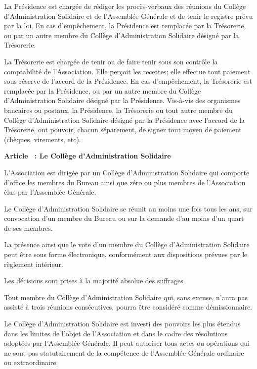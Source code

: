 \documentclass [11pt]{article}
\renewcommand {\section}[1]{\stepcounter {section}%
{\vspace {1em}\noindent\Large \bf Article \thesection\ : #1 \par}}
\begin{document}
La Présidence est chargée de rédiger les procès-verbaux des réunions du
Collège d'Administration Solidaire et de l'Assemblée Générale et de tenir le
registre prévu par la loi. En cas d'empêchement, la Présidence est remplacée
par la Trésorerie, ou par un autre membre du Collège d'Administration Solidaire
désigné par la Trésorerie.

La Trésorerie est chargée de tenir ou de faire tenir sous son contrôle la
comptabilité de l'Association. Elle perçoit les recettes; elle effectue tout
paiement sous réserve de l'accord de la Présidence. En cas d'empêchement, la
Trésorerie est remplacée par la Présidence, ou par un autre membre du Collège
d'Administration Solidaire désigné par la Présidence. Vis-à-vis des organismes
bancaires ou postaux, la Présidence, la Trésorerie ou tout autre membre du
Collège d'Administration Solidaire désigné par la Présidence avec l'accord de
la Trésorerie, ont pouvoir, chacun séparement, de signer tout moyen de paiement
(chèques, virements, etc).


\section {Le Collège d'Administration Solidaire}

L'Association est dirigée par un Collège d'Administration Solidaire qui
comporte d'office les membres du Bureau ainsi que zéro ou plus membres de
l'Association élus par l'Assemblée Générale.

Le Collège d'Administration Solidaire se réunit au moins une fois tous les
ans, sur convocation d'un membre du Bureau ou sur la demande d'au moins d'un
quart de ses membres.

La présence ainsi que le vote d'un membre du Collège d'Administration
Solidaire peut être sous forme électronique, conformément aux dispositions
prévues par le règlement intérieur.

Les décisions sont prises à la majorité absolue des suffrages.

Tout membre du Collège d'Administration Solidaire qui, sans excuse, n'aura
pas assisté à trois réunions consécutives, pourra être considéré comme
démissionnaire.

Le Collège d'Administration Solidaire est investi des pouvoirs les plus
étendus dans les limites de l'objet de l'Association et dans le cadre des
résolutions adoptées par l'Assemblée Générale. Il peut autoriser tous
actes ou opérations qui ne sont pas statutairement de la compétence
de l'Assemblée Générale ordinaire ou extraordinaire.
\end{document}
